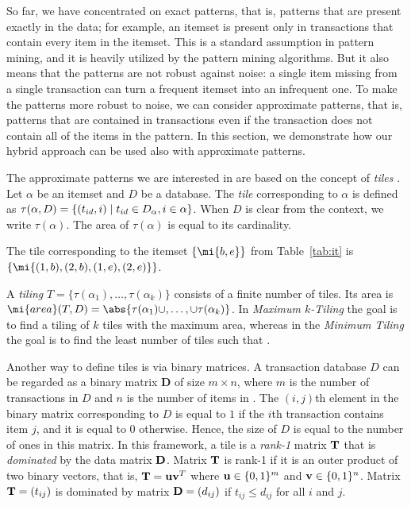 So far, we have concentrated on exact patterns, that is, patterns that are present exactly in the data; for example, an itemset is present only in transactions that contain every item in the itemset. This is a standard assumption in pattern mining, and it is heavily utilized by the pattern mining algorithms. But it also means that the patterns are not robust against noise: a single item missing from a single transaction can turn a frequent itemset into an infrequent one. To make the patterns more robust to noise, we can consider approximate patterns, that is, patterns that are  contained in transactions even if the transaction does not contain all of the items in the pattern. In this section, we demonstrate how our hybrid approach can be used also with approximate patterns.


The approximate patterns we are interested in are based on the concept of \emph{tiles} \parencite{tiling}.
Let $\alpha$ be an itemset and $D$ be a database. The \emph{tile} corresponding to
$\alpha$ is defined as $\tau(\alpha,D)=\{(t_{id},i)\mid t_{id} \in D_{\alpha}, i\in \alpha\}$. When $D$ is clear from the context, we write $\tau(\alpha)$.  The area of $\tau(\alpha)$ is equal to its cardinality.


\begin{example}
  \label{ex:tile}
The tile corresponding to the itemset $\{\mi{b,e}\}$ from Table~\ref{tab:it} is $\{\mi{(1,b),(2,b), (1,e), (2,e)}\}$.
\end{example}

A \emph{tiling} $T = \{\tau(\alpha_1),\dotsc, \tau(\alpha_k)\}$ consists of a finite number of tiles. Its area is $\mi{area}(T,D)=\abs{\tau(\alpha_1) \cup,\dotsc,\cup \tau(\alpha_k)}$. In \emph{Maximum $k$-Tiling} the goal is to find a tiling of $k$ tiles with the maximum area, whereas in the \emph{Minimum Tiling} the goal is to find the least number of tiles such that  \parencite{tiling}. 


Another way to define tiles is via binary matrices. A transaction database $D$ can be regarded as a binary matrix $\mathbf{D}$ of size
$m \times n$, where $m$ is the number of transactions in
$D$ and $n$ is the number of items in \revision{$\cI$}. The $(i, j)$th element in the binary matrix corresponding to
$D$ is equal to $1$ if the $i$th transaction contains item
$j$, and it is equal to $0$ otherwise. Hence, the size
of $D$ is equal to the number of ones in this matrix. In this framework, a tile is a \emph{rank-1} matrix $\mathbf{T}$ that is \emph{dominated} by the data matrix $\mathbf{D}$. Matrix $\mathbf{T}$ is rank-1 if it is an outer product of two binary vectors, that is, $\mathbf{T} = \mathbf{u}\mathbf{v}^T$ where $\mathbf{u}\in\{0,1\}^{m}$ and $\mathbf{v}\in\{0,1\}^n$. Matrix $\mathbf{T}=(t_{ij})$ is dominated by matrix $\mathbf{D}=(d_{ij})$ if $t_{ij} \leq d_{ij}$ for all $i$ and $j$. 

